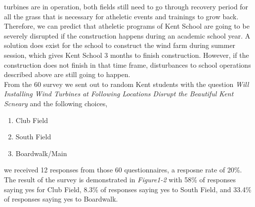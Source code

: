 \documentclass[review]{elsarticle}
\begin{document}
turbines are in operation, both fields still need to go through recovery period for all the grass that is necessary for atheletic events and trainings to grow back. Therefore, we 
can predict that atheletic programs of Kent School are going to be severely disrupted if the construction happens during an academic school year. A solution does exist for the school 
to construct the wind farm during summer session, which gives Kent School 3 months to finish construction. However, if the construction does not finish in that time frame, disturbances 
to school operations described above are still going to happen. %
\\\indent From the 60 survey we sent out to random Kent students with the question \textit{Will Installing Wind Turbines at Following Locations Disrupt the Beautiful Kent Scneary} 
and the following choices,

\begin{enumerate}
    \item Club Field
    \item South Field
    \item Boardwalk/Main
\end{enumerate}
we received 12 responses from those 60 questionnaires, a resposne rate of 20\%. The result of the survey is demonstrated in \textit{Figure1-2} with 58\% of responses saying yes 
for Club Field, 8.3\% of responses saying yes to South Field, and 33.4\% of responses saying yes to Boardwalk.
\\


\end{document}
